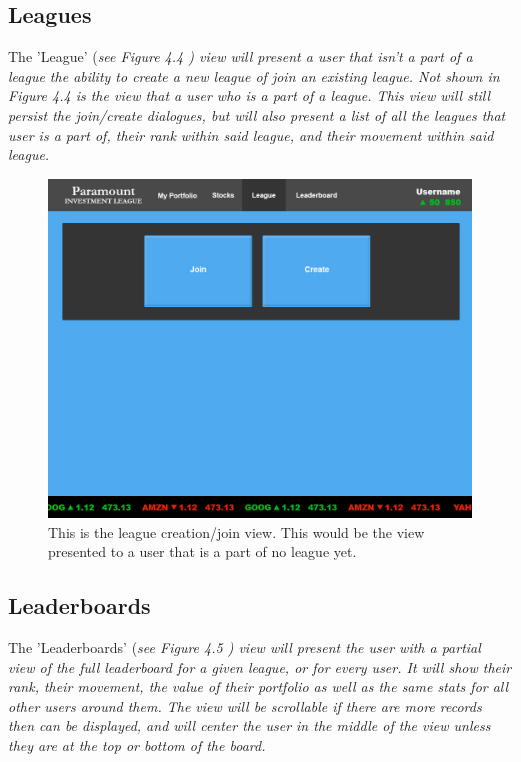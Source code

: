 \subsection{Leagues}

The 'League' (\em see Figure 4.4 \em) view will present a user that isn't a part of a league
the ability to create a new league of join an existing league.  Not shown in
\em Figure 4.4 \em is the view that a user who is a part of a league.  This view will still
persist the join/create dialogues, but will also present a list of all the leagues that user
is a part of, their rank within said league, and their movement within said league.\\

\begin{figure}
\centering
\includegraphics[width=5.5in]{./img/mock/league.jpg}
\caption{This is the league creation/join view. This would be the view presented to a user
that is a part of no league yet.}
\end{figure}


\subsection{Leaderboards}

The 'Leaderboards' (\em see Figure 4.5 \em) view will present the user with a partial view
of the full leaderboard for a given league, or for every user.  It will show their rank,
their movement, the value of their portfolio as well as the same stats for all other users
around them.  The view will be scrollable if there are more records then can be displayed,
and will center the user in the middle of the view unless they are at the top or bottom
of the board.\\

